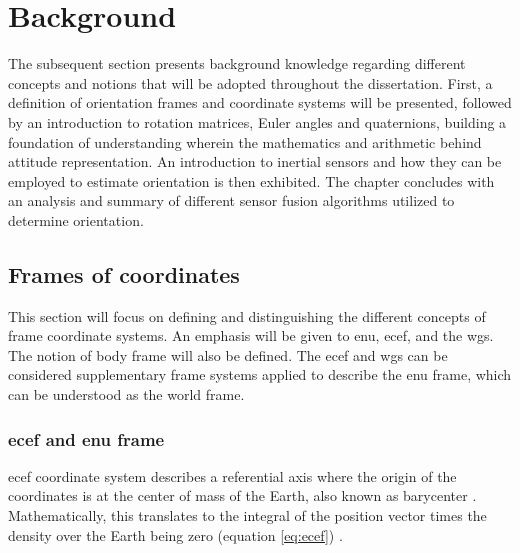 
\section{Background}

The subsequent section presents background knowledge regarding different concepts and notions that will be adopted throughout the dissertation.
First, a definition of orientation frames and coordinate systems will be presented, followed by an introduction to rotation matrices, Euler angles and quaternions, building a foundation of understanding wherein the mathematics and arithmetic behind attitude representation. An introduction to inertial sensors and how they can be employed to estimate orientation is then exhibited. The chapter concludes with an analysis and summary of different sensor fusion algorithms utilized to determine orientation.

\subsection{Frames of coordinates}

This section will focus on defining and distinguishing the different concepts of frame coordinate systems. An emphasis will be given to \acrfull{enu}, \acrfull{ecef}, and the \acrfull{wgs}. The notion of body frame will also be defined. The \acrshort{ecef} and \acrshort{wgs} can be considered supplementary frame systems applied to describe the \acrshort{enu} frame, which can be understood as the world frame.

\subsubsection{\acrshort{ecef} and \acrshort{enu} frame}

\acrshort{ecef} coordinate system describes a referential axis where the origin of the coordinates is at the center of mass of the Earth, also known as barycenter \cite{cai2011coordinate}. Mathematically, this translates to the integral of the position vector times the density over the Earth being zero (equation \ref{eq:ecef}) \cite{laundal2017magnetic}.

